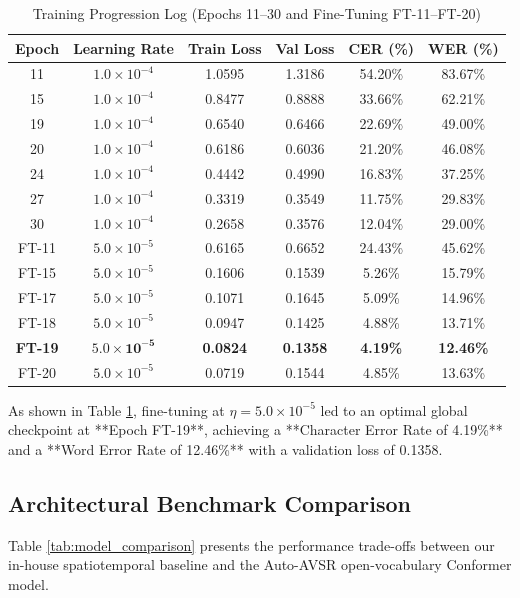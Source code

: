 \documentclass[conference,compsoc,10pt]{IEEEtran}
\begin{document}
\begin{table}[htbp]
\caption{Training Progression Log (Epochs 11--30 and Fine-Tuning FT-11--FT-20)}
\label{tab:training_log}
\centering
\begin{tabular}{cccccc}
\toprule
\textbf{Epoch} & \textbf{Learning Rate} & \textbf{Train Loss} & \textbf{Val Loss} & \textbf{CER (\%)} & \textbf{WER (\%)} \\
\midrule
11 & $1.0 \times 10^{-4}$ & 1.0595 & 1.3186 & 54.20\% & 83.67\% \\
15 & $1.0 \times 10^{-4}$ & 0.8477 & 0.8888 & 33.66\% & 62.21\% \\
19 & $1.0 \times 10^{-4}$ & 0.6540 & 0.6466 & 22.69\% & 49.00\% \\
20 & $1.0 \times 10^{-4}$ & 0.6186 & 0.6036 & 21.20\% & 46.08\% \\
24 & $1.0 \times 10^{-4}$ & 0.4442 & 0.4990 & 16.83\% & 37.25\% \\
27 & $1.0 \times 10^{-4}$ & 0.3319 & 0.3549 & 11.75\% & 29.83\% \\
30 & $1.0 \times 10^{-4}$ & 0.2658 & 0.3576 & 12.04\% & 29.00\% \\
\midrule
FT-11 & $5.0 \times 10^{-5}$ & 0.6165 & 0.6652 & 24.43\% & 45.62\% \\
FT-15 & $5.0 \times 10^{-5}$ & 0.1606 & 0.1539 & 5.26\% & 15.79\% \\
FT-17 & $5.0 \times 10^{-5}$ & 0.1071 & 0.1645 & 5.09\% & 14.96\% \\
FT-18 & $5.0 \times 10^{-5}$ & 0.0947 & 0.1425 & 4.88\% & 13.71\% \\
\textbf{FT-19} & $\mathbf{5.0 \times 10^{-5}}$ & \textbf{0.0824} & \textbf{0.1358} & \textbf{4.19\%} & \textbf{12.46\%} \\
FT-20 & $5.0 \times 10^{-5}$ & 0.0719 & 0.1544 & 4.85\% & 13.63\% \\
\bottomrule
\end{tabular}
\end{table}

As shown in Table \ref{tab:training_log}, fine-tuning at $\eta = 5.0 \times 10^{-5}$ led to an optimal global checkpoint at **Epoch FT-19**, achieving a **Character Error Rate of 4.19\%** and a **Word Error Rate of 12.46\%** with a validation loss of 0.1358.

\subsection{Architectural Benchmark Comparison}
Table \ref{tab:model_comparison} presents the performance trade-offs between our in-house spatiotemporal baseline and the Auto-AVSR open-vocabulary Conformer model.
\end{document}
